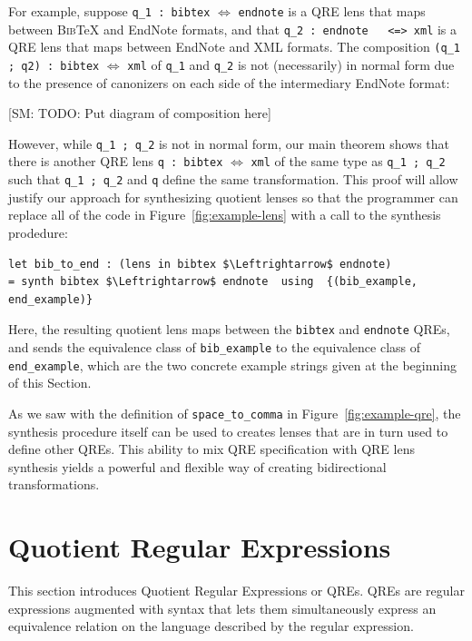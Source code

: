 \documentclass{svproc}
\newcommand{\cd}[1]{\lstinline[backgroundcolor=\color{white}]$#1$}
\newcommand{\FINISH}[3]{\ifdraft\textcolor{#1}{[#2: #3]}\fi}
\newcommand{\sam}[1]{\FINISH{dkpurple}{SM}{#1}}
\newcommand{\bibtex}{\textsc{Bib}\TeX{}}
\begin{document}
For example, suppose \cd{q_1 : bibtex} $\Leftrightarrow$ \cd{endnote} is a QRE
lens that maps between \bibtex{} and EndNote formats, and that \cd{q_2 : endnote
  <=> xml} is a QRE lens that maps between EndNote and XML formats. The
composition \cd{(q_1 ; q2) : bibtex} $\Leftrightarrow$ \cd{xml} of \cd{q_1} and
\cd{q_2} is not (necessarily) in normal form due to the presence of canonizers
on each side of the intermediary EndNote format:

\sam{TODO: Put diagram of composition here}

\noindent However, while \cd{q_1 ; q_2} is not in normal form, our main theorem
shows that there is another QRE lens \cd{q : bibtex} $\Leftrightarrow$ \cd{xml}
of the same type as \cd{q_1 ; q_2} such that \cd{q_1 ; q_2} and \cd{q} define
the same transformation. This proof will allow justify our approach for
synthesizing quotient lenses so that the programmer can replace all of the
code in Figure~\ref{fig:example-lens} with a call to the synthesis prodedure:

\begin{lstlisting}
let bib_to_end : (lens in bibtex $\Leftrightarrow$ endnote) 
= synth bibtex $\Leftrightarrow$ endnote  using  {(bib_example, end_example)}
\end{lstlisting}
\noindent Here, the resulting  quotient lens maps between the \cd{bibtex} and
\cd{endnote} QREs, and sends the equivalence class of \cd{bib_example} to
the equivalence class of \cd{end_example}, which are the two concrete example
strings given at the beginning of this Section.

As we saw with the definition of \cd{space_to_comma} in
Figure~\ref{fig:example-qre}, the synthesis procedure itself can be used to
creates lenses that are in turn used to define other QREs.  This ability to mix
QRE specification with QRE lens synthesis yields a powerful and flexible way of
creating bidirectional transformations.

\section{Quotient Regular Expressions}
\label{QRE}

This section introduces Quotient Regular Expressions or QREs. QREs are regular
expressions augmented with syntax that lets them simultaneously express an
equivalence relation on the language described by the regular expression.
\end{document}
